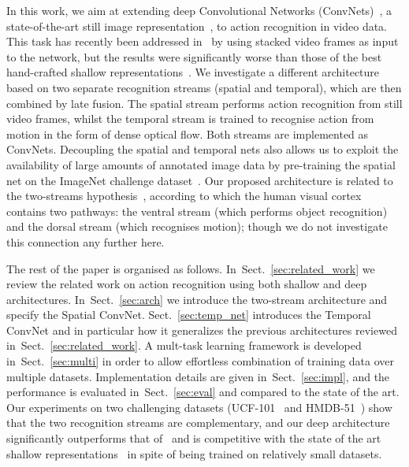 \documentclass{article} \usepackage{nips14submit_e,times}
\newcommand{\sref}[1]{Sect.~\ref{#1}}
\begin{document}
In this work, we aim at extending deep Convolutional Networks
(ConvNets)~\cite{Lecun89}, a state-of-the-art still image
representation~\cite{Krizhevsky12}, to action recognition in video data. This task
has
recently been  addressed in~\cite{Karpathy14} by using stacked video frames
as input to the network, but the results were significantly worse than
those of the best hand-crafted shallow
representations~\cite{Wang13b,Peng14}.  We investigate a different architecture
based on two separate recognition streams (spatial and
temporal), which are then combined by late fusion.  The spatial stream
performs action recognition from still video frames, whilst the
temporal stream is trained to recognise action from motion in the form
of dense optical flow.  Both streams are implemented as ConvNets.
Decoupling the spatial and temporal nets also allows us to
exploit the availability of large amounts of annotated image data by
pre-training the spatial net on the ImageNet challenge
dataset~\cite{Berg10a}.  Our proposed architecture is related
to the two-streams
hypothesis~\cite{Goodale92}, according to which the human visual
cortex contains two pathways: the ventral stream (which performs
object recognition) and the dorsal stream (which recognises
motion); though we do not investigate this connection any further here.


The rest of the paper is organised as
follows. In~\sref{sec:related_work} we review the related work on
action recognition using both shallow and deep architectures. In~\sref{sec:arch}
we introduce the two-stream architecture and specify the Spatial ConvNet. 
\sref{sec:temp_net} introduces the Temporal ConvNet and in particular how
it generalizes the previous architectures reviewed in~\sref{sec:related_work}.
A mult-task learning framework is developed in~\sref{sec:multi} in
order to allow effortless combination of training data over multiple datasets.
Implementation details are given in~\sref{sec:impl}, and the performance is evaluated
in~\sref{sec:eval} and compared to the state of the art.
Our experiments on two challenging datasets
(UCF-101~\cite{Soomro12} and HMDB-51~\cite{Kuehne11}) show that the
two recognition streams are complementary, and our deep architecture
significantly outperforms that of~\cite{Karpathy14} and is competitive
with the state of the art shallow
representations~\cite{Wang13b,Peng14,Peng14a} in spite of being trained on
relatively small datasets.
\end{document}

